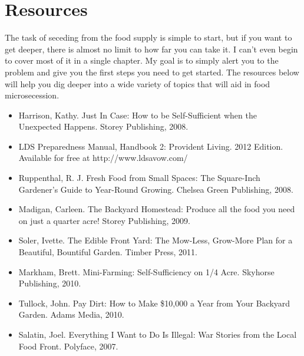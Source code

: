 \section{Resources}

The task of seceding from the food supply is simple to start, but if you
want to get deeper, there is almost no limit to how far you can take
it. I can’t even begin to cover most of it in a single chapter. My goal
is to simply alert you to the problem and give you the first steps
you need to get
started. The resources below will help you
dig deeper into a
wide variety of topics that will aid in food microsecession.

\begin{itemize}
\item 
Harrison, Kathy. Just In Case: How to be Self-Sufficient when the
Unexpected Happens. Storey Publishing, 2008. 
\item 
LDS Preparedness Manual, Handbook 2: Provident Living. 2012 Edition.
Available for free at http://www.ldsavow.com/
\item 
Ruppenthal, R. J. Fresh Food from Small Spaces: The Square-Inch
Gardener’s Guide to Year-Round Growing. Chelsea Green Publishing,
2008.
\item 
Madigan, Carleen. The Backyard Homestead: Produce all the food you need
on just a quarter acre!  Storey Publishing, 2009.
\item 
Soler, Ivette. The Edible Front Yard:  The Mow-Less, Grow-More Plan for
a Beautiful, Bountiful Garden. Timber Press, 2011.
\item 
Markham, Brett. Mini-Farming: Self-Sufficiency on 1/4 Acre. Skyhorse
Publishing, 2010.
\item 
Tullock, John. Pay Dirt: How to Make \$10,000 a Year from Your Backyard
Garden. Adams Media, 2010.
\item 
Salatin, Joel. Everything I Want to Do Is Illegal: War Stories from the
Local Food Front. Polyface, 2007.
\end{itemize}
